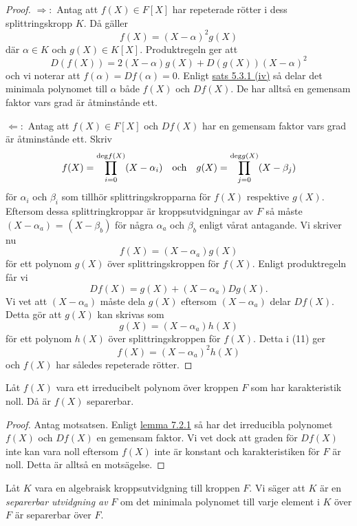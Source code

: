 \documentclass{article}
\newcommand{\grad}[0]{\textnormal{deg}}
\theoremstyle{definition}
\begin{document}
\begin{proof}
  $\Rightarrow:$ Antag att $f(X) \in F[X]$ har repeterade rötter i dess splittringskropp $K$. Då gäller 
  \[f(X) = (X-\alpha)^2 g(X)\]
  där $\alpha \in K$ och $g(X) \in K[X].$ Produktregeln ger att 
  \[D(f(X)) = 2(X- \alpha) g(X) + D(g(X)) (X - \alpha)^2\]
  och vi noterar att $f(\alpha) = Df(\alpha) = 0.$ Enligt \hyperlink{minpol}{sats 5.3.1 (iv)} så delar det minimala polynomet till $\alpha$ både 
  $f(X)$ och $Df(X)$. De har alltså en gemensam faktor vars grad är åtminstånde ett. 

  $\Leftarrow:$ Antag att $f(X) \in F[X]$ och $Df(X)$ har en gemensam faktor vars grad är åtminstånde ett. 
  Skriv 
  \[f(X) = \prod_{i = 0}^{\grad f(X)} (X-\alpha_i) \quad \textnormal{och} \quad g(X) = \prod_{j = 0}^{\grad g(X)} (X-\beta_j)\]
  för $\alpha_i$ och $\beta_i$ som tillhör splittringskropparna för $f(X)$ respektive $g(X)$. Eftersom dessa 
  splittringkroppar är kroppsutvidgningar av $F$ så måste $(X - \alpha_a)$ = $(X - \beta_b)$ för några $\alpha_a$ och $\beta_b$ enligt vårat antagande. 
  Vi skriver nu 
  \begin{equation}
    f(X) = (X-\alpha_a)g(X)
  \end{equation}
  för ett polynom $g(X)$ över splittringskroppen för $f(X)$. Enligt produktregeln får vi 
  \[Df(X) = g(X) + (X - \alpha_a)Dg(X).\]
  Vi vet att $(X - \alpha_a)$ måste dela $g(X)$ eftersom $(X - \alpha_a)$ delar $Df(X)$. Detta gör att $g(X)$ kan skrivas som
  \[g(X) = (X - \alpha_a)h(X)\]
  för ett polynom $h(X)$ över splittringskroppen för $f(X)$. Detta i (11) ger 
  \[f(X) = (X - \alpha_a)^2h(X)\]
  och $f(X)$ har således repeterade rötter.
\end{proof}

\begin{myprop}{}{}
  Låt $f(X)$ vara ett irreducibelt polynom över kroppen $F$ som har karakteristik noll. Då är $f(X)$ separerbar. 
\end{myprop}

\begin{proof}
  Antag motsatsen. Enligt \hyperlink{lemma7.2.1}{lemma 7.2.1} så har det irreducibla polynomet $f(X)$ och $Df(X)$ en gemensam faktor. 
  Vi vet dock att graden för $Df(X)$ inte kan vara noll eftersom $f(X)$ inte är konstant och karakteristiken för $F$ är noll. Detta är alltså 
  en motsägelse.
\end{proof}

\begin{mydef}{}{}
  Låt $K$ vara en algebraisk kroppsutvidgning till kroppen $F$. Vi säger att $K$ är en \textit{separerbar utvidgning av} $F$ om 
  det minimala polynomet till varje element i $K$ över $F$ är separerbar över $F$. 
\end{mydef}
\end{document}
